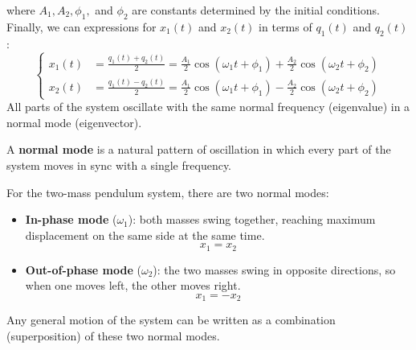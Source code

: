\documentclass[11pt]{report}
\begin{document}
\begin{definition}
\begin{equation}
    \end{equation}
    where \( A_1, A_2, \phi_1, \) and \( \phi_2 \) are constants determined by the initial conditions. Finally, we can expressions for \( x_1(t) \) and \( x_2(t) \) in terms of \( q_1(t) \) and \( q_2(t) \):
    \begin{equation}
        \begin{cases}
            x_1(t) &= \frac{q_1(t) + q_2(t)}{2} = \frac{A_1}{2} \cos(\omega_1 t + \phi_1) + \frac{A_2}{2} \cos(\omega_2 t + \phi_2) \\
            x_2(t) &= \frac{q_1(t) - q_2(t)}{2} = \frac{A_1}{2} \cos(\omega_1 t + \phi_1) - \frac{A_2}{2} \cos(\omega_2 t + \phi_2)
        \end{cases}
    \end{equation}
    All parts of the system oscillate with the same normal frequency (eigenvalue) in a normal mode (eigenvector).
\end{definition}

\begin{definition}
    A \textbf{normal mode} is a natural pattern of oscillation in which every part of the system moves in sync with a single frequency. 

    For the two-mass pendulum system, there are two normal modes:
    \begin{itemize}
        \item \textbf{In-phase mode} (\(\omega_1\)): both masses swing together, reaching maximum displacement on the same side at the same time.  
        $$
        x_1 = x_2
        $$
        
        \item \textbf{Out-of-phase mode} (\(\omega_2\)): the two masses swing in opposite directions, so when one moves left, the other moves right.  
        $$
        x_1 = -x_2
        $$
    \end{itemize}

    Any general motion of the system can be written as a combination (superposition) of these two normal modes.
\end{definition}
\end{document}
